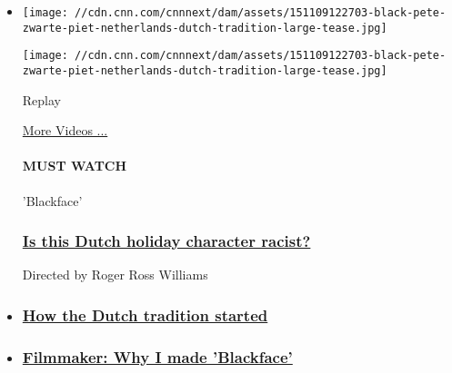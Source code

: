 \begin{itemize}
\item
  \texttt{[image: //cdn.cnn.com/cnnnext/dam/assets/151109122703-black-pete-zwarte-piet-netherlands-dutch-tradition-large-tease.jpg]}

  \texttt{[image: //cdn.cnn.com/cnnnext/dam/assets/151109122703-black-pete-zwarte-piet-netherlands-dutch-tradition-large-tease.jpg]}\href{javascript:void(0);}{}

  Replay

  \href{/videos}{More Videos ...}

  \hypertarget{must-watch-1}{%
  \paragraph{MUST WATCH}\label{must-watch-1}}

  'Blackface'

  \hypertarget{is-this-dutch-holiday-character-racist}{%
  \subsubsection{\texorpdfstring{\href{/videos/tv/2015/11/25/digital-shorts-blackface-dutch-holiday-roger-ross-williams-orig.cnn}{Is
  this Dutch holiday character
  racist?}}{Is this Dutch holiday character racist?}}\label{is-this-dutch-holiday-character-racist}}

  Directed by Roger Ross Williams
\item
  \hypertarget{how-the-dutch-tradition-started}{%
  \subsubsection{\texorpdfstring{\href{/2015/11/30/world/blackface-documentary-zwarte-piet-feat/index.html}{How
  the Dutch tradition
  started}}{How the Dutch tradition started}}\label{how-the-dutch-tradition-started}}
\item
  \hypertarget{filmmaker-why-i-made-blackface}{%
  \subsubsection{\texorpdfstring{\href{/2015/11/30/opinions/blackface-zwarte-piet-director-statement-ross-williams/index.html}{Filmmaker:
  Why I made
  'Blackface'}}{Filmmaker: Why I made 'Blackface'}}\label{filmmaker-why-i-made-blackface}}
\end{itemize}

